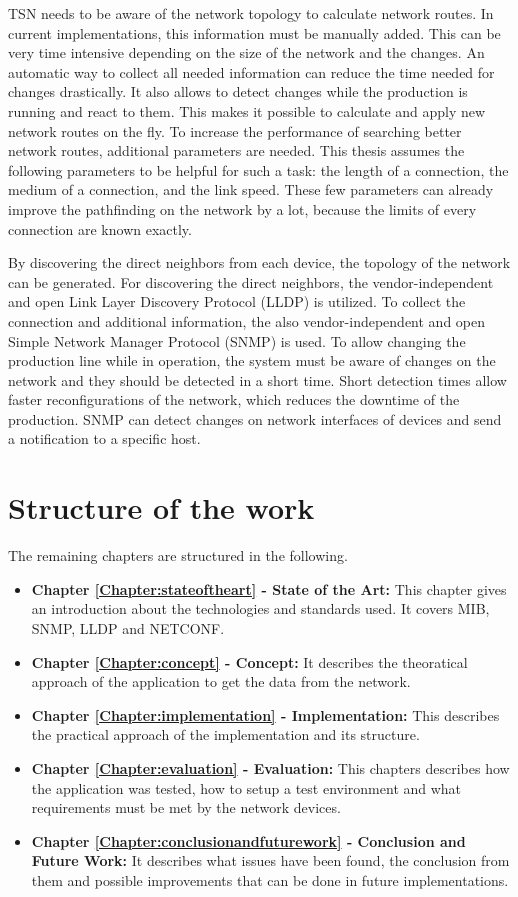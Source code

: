 TSN needs to be aware of the network topology to calculate network routes. In current implementations, this information must be manually added. This can be very time intensive depending on the size of the network and the changes. An automatic way to collect all needed information can reduce the time needed for changes drastically. It also allows to detect changes while the production is running and react to them. This makes it possible to calculate and apply new network routes on the fly. To increase the performance of searching better network routes, additional parameters are needed. This thesis assumes the following parameters to be helpful for such a task: the length of a connection, the medium of a connection, and the link speed. These few parameters can already improve the pathfinding on the network by a lot, because the limits of every connection are known exactly.

By discovering the direct neighbors from each device, the topology of the network can be generated. For discovering the direct neighbors, the vendor-independent and open Link Layer Discovery Protocol (LLDP) is utilized. To collect the connection and additional information, the also vendor-independent and open Simple Network Manager Protocol (SNMP) is used. To allow changing the production line while in operation, the system must be aware of changes on the network and they should be detected in a short time. Short detection times allow faster reconfigurations of the network, which reduces the downtime of the production. SNMP can detect changes on network interfaces of devices and send a notification to a specific host.

\newpage
\section{Structure of the work}
The remaining chapters are structured in the following.
\begin{itemize}
    \item \textbf{Chapter \ref{Chapter:stateoftheart} - State of the Art:} This chapter gives an introduction about the technologies and standards used. It covers MIB, SNMP, LLDP and NETCONF.
    \item \textbf{Chapter \ref{Chapter:concept} - Concept:} It describes the theoratical approach of the application to get the data from the network.
    \item \textbf{Chapter \ref{Chapter:implementation} -  Implementation:} This describes the practical approach of the implementation and its structure.
    \item \textbf{Chapter \ref{Chapter:evaluation} - Evaluation:} This chapters describes how the application was tested, how to setup a test environment and what requirements must be met by the network devices.
    \item \textbf{Chapter \ref{Chapter:conclusionandfuturework} - Conclusion and Future Work:} It describes what issues have been found, the conclusion from them and possible improvements that can be done in future implementations.
\end{itemize}